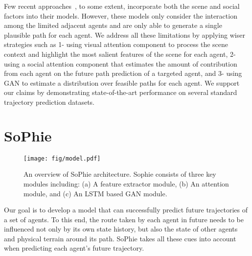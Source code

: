 \documentclass[10pt,twocolumn,letterpaper]{article}
\begin{document}
Few recent approaches~\cite{lee2017desire,xue2018ss,bartoli2017context}, to some extent, incorporate both the scene and social factors into their models. However, these models only consider the interaction among the limited adjacent agents and are only able to generate a single plausible path for each agent. We address all these limitations by applying wiser strategies such as 1- using visual attention component to process the scene context and highlight the most salient features of the scene for each agent, 2- using a social attention component that estimates the amount of contribution from each agent on the future path prediction of a targeted agent, and 3- using GAN to estimate a distribution over feasible paths for each agent. We support our claims by demonstrating state-of-the-art performance on several standard trajectory prediction datasets.


\section{SoPhie}
\label{sec:SoPhie}


\begin{figure*}[ht!]
  \centering
    \texttt{[image: fig/model.pdf]}
\caption{\small An overview of SoPhie architecture. Sophie consists of three key modules including: (a) A feature extractor module, (b) An attention module, and (c) An LSTM based GAN module.}
\label{fig:model}
\end{figure*}


Our goal is to develop a model that can successfully predict future trajectories of a set of agents. To this end, the route taken by each agent in future needs to be influenced not only by its own state history, but also the state of other agents and physical terrain around its path. SoPhie takes all these cues into account when predicting each agent's future trajectory.
\end{document}
